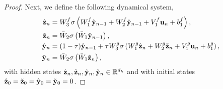 \documentclass{article} \usepackage{iclr2022_conference,times}
\newcommand{\by}{{\bf y}}
\newcommand{\bz}{{\bf z}}
\newcommand{\bu}{{\bf u}}
\newcommand{\R}{{\mathbb R}}
\begin{document}
\begin{proof}
Next, we define the following dynamical system,
\begin{equation}
    \label{eq:exp25}
    \begin{aligned}
\hat{\bz}_n &= W^f_3\sigma\left(W^f_1 \tilde{\by}_{n-1} + W^f_2 \hat{\by}_{n-1} + V^f_1 \bu_n + b^f_1 \right), \\
\tilde{\bz}_n &= \bar{W}_2\sigma\left(\bar{W}_1 \hat{\by}_{n-1} \right), \\
\hat{\by}_n &= (1-\tau)\hat{\by}_{n-1} +\tau W^g_3\sigma\left(W^g_1 \hat{\bz}_{n} + W^g_2 \tilde{\bz}_{n} + V^g_1 \bu_n + b^g_1 \right), \\
\tilde{\by}_n &= \bar{W}_2\sigma\left(\bar{W}_1 \hat{\bz}_{n} \right),
    \end{aligned}
\end{equation}
with hidden states $\hat{\bz}_n,\tilde{\bz}_n, \hat{\by}_n,\tilde{\by}_n \in \R^{d_h}$ and with initial states $\hat{\bz}_0 = \tilde{\bz}_0=\hat{\by}_0 = \tilde{\by}_0 = 0$.


\end{proof}
\end{document}
